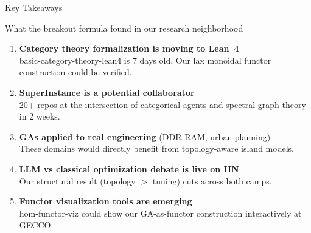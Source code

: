 \documentclass[aspectratio=169,14pt]{beamer}
\begin{document}
{
\begin{frame}[plain]{Key Takeaways}
  \vspace{-4pt}
  {\small\color{dimGray} What the breakout formula found in our research neighborhood}
  \vspace{6pt}

  \begin{enumerate}
    \item \textbf{Category theory formalization is moving to Lean~4}\\
      {\small basic-category-theory-lean4 is 7 days old. Our lax monoidal functor construction could be verified.}
    \vspace{4pt}
    \item \textbf{SuperInstance is a potential collaborator}\\
      {\small 20+ repos at the intersection of categorical agents and spectral graph theory in 2 weeks.}
    \vspace{4pt}
    \item \textbf{GAs applied to real engineering} {\small(DDR RAM, urban planning)}\\
      {\small These domains would directly benefit from topology-aware island models.}
    \vspace{4pt}
    \item \textbf{LLM vs classical optimization debate is live on HN}\\
      {\small Our structural result (topology $>$ tuning) cuts across both camps.}
    \vspace{4pt}
    \item \textbf{Functor visualization tools are emerging}\\
      {\small hom-functor-viz could show our GA-as-functor construction interactively at GECCO.}
  \end{enumerate}
\end{frame}
}
\end{document}
